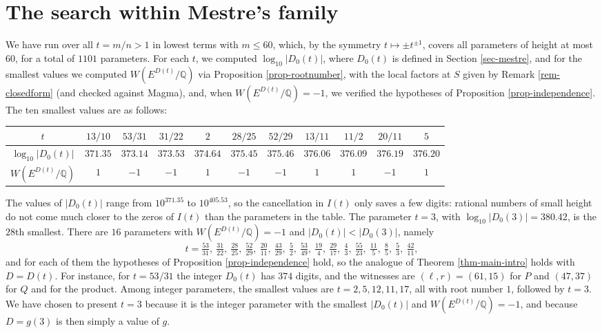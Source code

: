 \documentclass[11pt]{amsart}
\newcommand{\Q}{\mathbb Q}
\begin{document}
\section{The search within Mestre's family}\label{sec-search}

We have run over all $t=m/n>1$ in lowest terms with $m\leq 60$, which, by the symmetry $t\mapsto \pm t^{\pm 1}$, covers all parameters of height at most $60$, for a total of $1101$ parameters. For each $t$, we computed $\log_{10}|D_0(t)|$, where $D_0(t)$ is defined in Section \ref{sec-mestre}, and for the smallest values we computed $W(E^{D(t)}/\Q)$ via Proposition \ref{prop-rootnumber}, with the local factors at $S$ given by Remark \ref{rem-closedform} (and checked against Magma), and, when $W(E^{D(t)}/\Q)=-1$, we verified the hypotheses of Proposition \ref{prop-independence}. The ten smallest values are as follows:
\begin{center}
{\small\setlength{\tabcolsep}{3.5pt}\begin{tabular}{|c|cccccccccc|}
\hline
$t$ & $13/10$ & $53/31$ & $31/22$ & $2$ & $28/25$ & $52/29$ & $13/11$ & $11/2$ & $20/11$ & $5$ \\ \hline
$\log_{10}|D_0(t)|$ & $371.35$ & $373.14$ & $373.53$ & $374.64$ & $375.45$ & $375.46$ & $376.06$ & $376.09$ & $376.19$ & $376.20$\\\hline
$W(E^{D(t)}/\Q)$ & $1$ & $-1$ & $-1$ & $1$ & $-1$ & $-1$ & $1$ & $1$ & $-1$ & $1$\\
\hline
\end{tabular}}
\end{center}
The values of $|D_0(t)|$ range from $10^{371.35}$ to $10^{405.53}$, so the cancellation in $I(t)$ only saves a few digits: rational numbers of small height do not come much closer to the zeros of $I(t)$ than the parameters in the table. The parameter $t=3$, with $\log_{10}|D_0(3)|=380.42$, is the $28$th smallest. There are $16$ parameters with $W(E^{D(t)}/\Q)=-1$ and $|D_0(t)|<|D_0(3)|$, namely
$$t=\tfrac{53}{31},\ \tfrac{31}{22},\ \tfrac{28}{25},\ \tfrac{52}{29},\ \tfrac{20}{11},\ \tfrac{43}{29},\ \tfrac{5}{2},\ \tfrac{53}{49},\ \tfrac{19}{4},\ \tfrac{29}{17},\ \tfrac{4}{3},\ \tfrac{55}{23},\ \tfrac{11}{5},\ \tfrac{8}{5},\ \tfrac{5}{3},\ \tfrac{42}{11},$$
and for each of them the hypotheses of Proposition \ref{prop-independence} hold, so the analogue of Theorem \ref{thm-main-intro} holds with $D=D(t)$. For instance, for $t=53/31$ the integer $D_0(t)$ has $374$ digits, and the witnesses are $(\ell,r)=(61,15)$ for $P$ and $(47,37)$ for $Q$ and for the product. Among integer parameters, the smallest values are $t=2,5,12,11,17$, all with root number $1$, followed by $t=3$. We have chosen to present $t=3$ because it is the integer parameter with the smallest $|D_0(t)|$ and $W(E^{D(t)}/\Q)=-1$, and because $D=g(3)$ is then simply a value of $g$.
\end{document}
